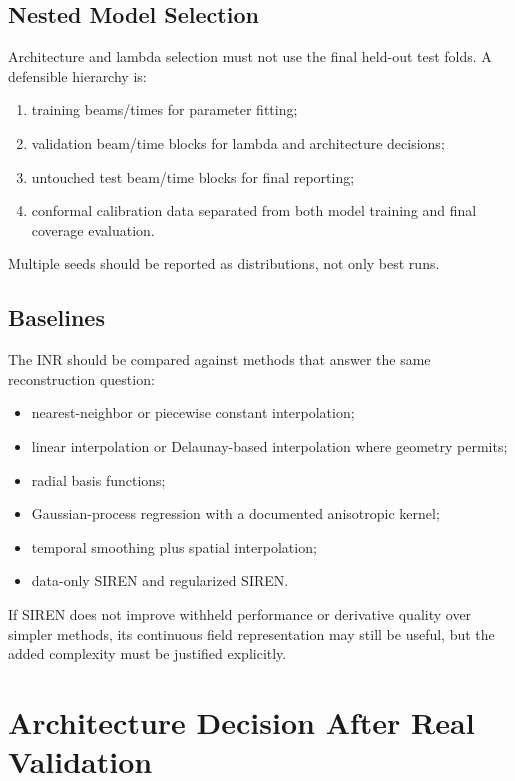 \documentclass[11pt]{article}
\begin{document}
\subsection{Nested Model Selection}

Architecture and lambda selection must not use the final held-out test folds. A defensible hierarchy is:
\begin{enumerate}
  \item training beams/times for parameter fitting;
  \item validation beam/time blocks for lambda and architecture decisions;
  \item untouched test beam/time blocks for final reporting;
  \item conformal calibration data separated from both model training and final coverage evaluation.
\end{enumerate}
Multiple seeds should be reported as distributions, not only best runs.

\subsection{Baselines}

The INR should be compared against methods that answer the same reconstruction question:
\begin{itemize}
  \item nearest-neighbor or piecewise constant interpolation;
  \item linear interpolation or Delaunay-based interpolation where geometry permits;
  \item radial basis functions;
  \item Gaussian-process regression with a documented anisotropic kernel;
  \item temporal smoothing plus spatial interpolation;
  \item data-only SIREN and regularized SIREN.
\end{itemize}
If SIREN does not improve withheld performance or derivative quality over simpler methods, its continuous
field representation may still be useful, but the added complexity must be justified explicitly.

\section{Architecture Decision After Real Validation}
\end{document}
